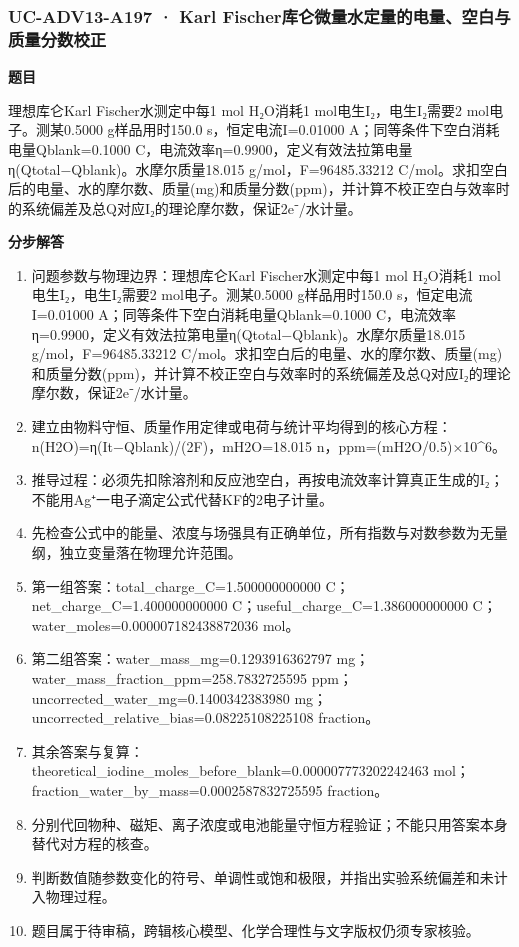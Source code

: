 \documentclass[UTF8,11pt,a4paper]{ctexart}
\begin{document}
\subsubsection*{UC-ADV13-A197 · Karl Fischer库仑微量水定量的电量、空白与质量分数校正}
\noindent\textbf{题目}\par
理想库仑Karl Fischer水测定中每1 mol H₂O消耗1 mol电生I₂，电生I₂需要2 mol电子。测某0.5000 g样品用时150.0 s，恒定电流I=0.01000 A；同等条件下空白消耗电量Qblank=0.1000 C，电流效率η=0.9900，定义有效法拉第电量η(Qtotal−Qblank)。水摩尔质量18.015 g/mol，F=96485.33212 C/mol。求扣空白后的电量、水的摩尔数、质量(mg)和质量分数(ppm)，并计算不校正空白与效率时的系统偏差及总Q对应I₂的理论摩尔数，保证2e⁻/水计量。\par
\medskip\noindent\textbf{分步解答}
\begin{enumerate}
\item 问题参数与物理边界：理想库仑Karl Fischer水测定中每1 mol H₂O消耗1 mol电生I₂，电生I₂需要2 mol电子。测某0.5000 g样品用时150.0 s，恒定电流I=0.01000 A；同等条件下空白消耗电量Qblank=0.1000 C，电流效率η=0.9900，定义有效法拉第电量η(Qtotal−Qblank)。水摩尔质量18.015 g/mol，F=96485.33212 C/mol。求扣空白后的电量、水的摩尔数、质量(mg)和质量分数(ppm)，并计算不校正空白与效率时的系统偏差及总Q对应I₂的理论摩尔数，保证2e⁻/水计量。
\item 建立由物料守恒、质量作用定律或电荷与统计平均得到的核心方程：n(H2O)=η(It−Qblank)/(2F)，mH2O=18.015 n，ppm=(mH2O/0.5)×10\textasciicircum{}6。
\item 推导过程：必须先扣除溶剂和反应池空白，再按电流效率计算真正生成的I₂；不能用Ag⁺一电子滴定公式代替KF的2电子计量。
\item 先检查公式中的能量、浓度与场强具有正确单位，所有指数与对数参数为无量纲，独立变量落在物理允许范围。
\item 第一组答案：total\_charge\_C=1.500000000000 C；net\_charge\_C=1.400000000000 C；useful\_charge\_C=1.386000000000 C；water\_moles=0.000007182438872036 mol。
\item 第二组答案：water\_mass\_mg=0.1293916362797 mg；water\_mass\_fraction\_ppm=258.7832725595 ppm；uncorrected\_water\_mg=0.1400342383980 mg；uncorrected\_relative\_bias=0.08225108225108 fraction。
\item 其余答案与复算：theoretical\_iodine\_moles\_before\_blank=0.000007773202242463 mol；fraction\_water\_by\_mass=0.0002587832725595 fraction。
\item 分别代回物种、磁矩、离子浓度或电池能量守恒方程验证；不能只用答案本身替代对方程的核查。
\item 判断数值随参数变化的符号、单调性或饱和极限，并指出实验系统偏差和未计入物理过程。
\item 题目属于待审稿，跨辑核心模型、化学合理性与文字版权仍须专家核验。
\end{enumerate}
\end{document}

